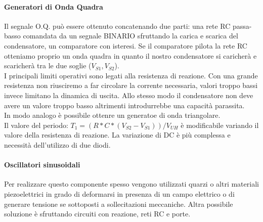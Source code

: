 \documentclass[12pt]{article}
\begin{document}
\paragraph{Generatori di Onda Quadra}
Il segnale O.Q. può essere ottenuto concatenando due parti: una rete RC passa-basso comandata da un segnale BINARIO sfruttando la carica e scarica del condensatore, un comparatore con isteresi. Se il comparatore pilota la rete RC otteniamo proprio un onda quadra in quanto il nostro condensatore si caricherà e scaricherà tra le due soglie ($V_{S1}, V_{S2}$).\\
I principali limiti operativi sono legati alla resistenza di reazione. Con una grande resistenza non riusciremo a far circolare la corrente necessaria, valori troppo bassi invece limitano la dinamica di uscita. Allo stesso modo il condensatore non deve avere un valore troppo basso altrimenti introdurrebbe una capacità parassita.\\
In modo analogo è possibile ottenre un generatoe di onda triangolare.\\
Il valore del periodo: $T_{1} = (R*C*(V_{S2}-V_{S1}))/V_{UH}$ è modificabile variando il valore della resistenza di reazione. La variazione di DC è più complessa e necessità dell'utilizzo di due diodi.\\

\paragraph{Oscillatori sinusoidali}
Per realizzare questo componente spesso vengono utilizzati quarzi o altri materiali piezoelettrici in grado di deformarsi in presenza di un campo elettrico o di generare tensione se sottoposti a sollecitazioni meccaniche. Altra possibile soluzione è sfruttando circuiti con reazione, reti RC e porte.

\end{document}
